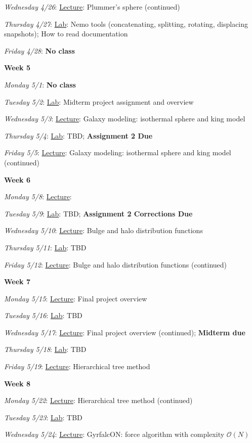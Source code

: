 \documentclass[12pt]{article}
\begin{document}
\emph{Wednesday 4/26}: \underline{Lecture}: Plummer's sphere (continued)

\emph{Thursday 4/27}: \underline{Lab}: Nemo tools (concatenating, splitting, rotating, displacing snapshots); How to read documentation

\emph{Friday 4/28}: \textbf{No class}

\noindent\textbf{Week 5}

\emph{Monday 5/1}: \textbf{No class}

\emph{Tuesday 5/2}: \underline{Lab}: Midterm project assignment and overview

\emph{Wednesday 5/3}: \underline{Lecture}: Galaxy modeling: isothermal sphere and king model

\emph{Thursday 5/4}: \underline{Lab}: TBD; \textbf{Assignment 2 Due}

\emph{Friday 5/5}: \underline{Lecture}: Galaxy modeling: isothermal sphere and king model (continued)

\noindent\textbf{Week 6}

\emph{Monday 5/8}: \underline{Lecture}:

\emph{Tuesday 5/9}: \underline{Lab}: TBD; \textbf{Assignment 2 Corrections Due}

\emph{Wednesday 5/10}: \underline{Lecture}: Bulge and halo distribution functions

\emph{Thursday 5/11}: \underline{Lab}: TBD

\emph{Friday 5/12}: \underline{Lecture}: Bulge and halo distribution functions (continued)

\noindent\textbf{Week 7}

\emph{Monday 5/15}: \underline{Lecture}: Final project overview

\emph{Tuesday 5/16}: \underline{Lab}: TBD

\emph{Wednesday 5/17}: \underline{Lecture}: Final project overview (continued); \textbf{Midterm due}

\emph{Thursday 5/18}: \underline{Lab}: TBD

\emph{Friday 5/19}: \underline{Lecture}: Hierarchical tree method

\noindent\textbf{Week 8}

\emph{Monday 5/22}: \underline{Lecture}: Hierarchical tree method (continued)

\emph{Tuesday 5/23}: \underline{Lab}: TBD

\emph{Wednesday 5/24}: \underline{Lecture}: GyrfalcON: force algorithm with complexity $\mathcal{O}(N)$
\end{document}
